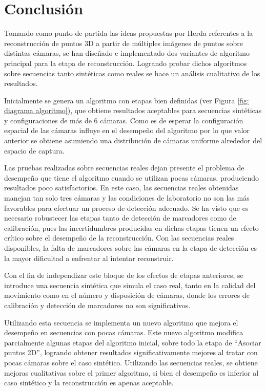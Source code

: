 \section{Conclusión} 

Tomando como punto de partida las ideas propuestas por Herda referentes a la reconstrucción de puntos 3D a partir de múltiples imágenes de puntos sobre distintas cámaras,  se han diseñado e implementado dos variantes de algoritmo principal para la etapa de reconstrucción. Logrando probar dichos algoritmos sobre secuencias tanto sintéticas como reales se hace un análisis cualitativo de los resultados.


Inicialmente se genera un algoritmo con etapas bien definidas (ver Figura \ref{fig: diagrama algoritmo}), que obtiene resultados aceptables para secuencias sintéticas y configuraciones de más de 6 cámaras. Como es de esperar la configuración espacial de las cámaras influye en el desempeño del algoritmo por lo que valor anterior se obtiene asumiendo una distribución de cámaras uniforme alrededor del espacio de captura.


Las pruebas realizadas sobre secuencias reales dejan presente el problema de desempeño que tiene el algoritmo cuando se utilizan pocas cámaras, produciendo resultados poco satisfactorios. 
En este caso, las secuencias reales obtenidas manejan tan solo tres cámaras y las condiciones de laboratorio no son las más favorables para efectuar un proceso de detección adecuado. Se ha visto que es necesario robustecer las etapas tanto de detección de marcadores  como de calibración, pues las incertidumbres producidas en dichas etapas tienen un efecto crítico sobre el desempeño de la reconstrucción. Con las secuencias reales disponibles, la falta de marcadores sobre las cámaras en la etapa de detección es la mayor dificultad a enfrentar al intentar reconstruir. 



Con el fin de independizar este bloque de los efectos de etapas anteriores, se introduce una secuencia sintética que simula el caso real, tanto en la calidad del movimiento como en el número y disposición de cámaras, donde los errores de calibración y detección de marcadores no son significativos.


Utilizando esta secuencia se implementa un nuevo algoritmo que mejora el desempeño en secuencias con pocas cámaras. Este nuevo algoritmo modifica parcialmente algunas etapas del algoritmo inicial, sobre todo la etapa de “Asociar puntos 2D”, logrando obtener resultados significativamente mejores al tratar con pocas cámaras sobre el caso sintético.
Utilizando las secuencias reales, se obtiene mejoras cualitativas sobre el primer algoritmo, si bien el desempeño es inferior al caso sintético y la reconstrucción es apenas aceptable.  \\ 


